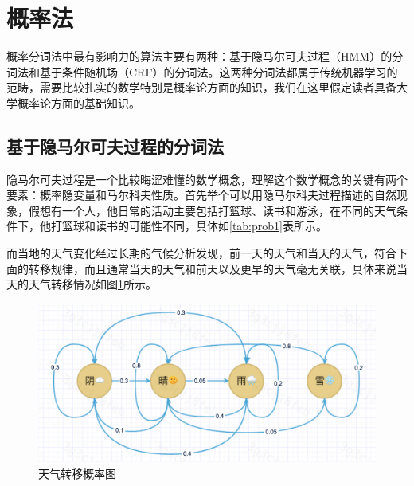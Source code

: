 \documentclass[twoside,a4paper,12pt]{book}%
\begin{document}
\section{概率法}
概率分词法中最有影响力的算法主要有两种：基于隐马尔可夫过程（\gls{HMM}）的分词法和基于条件随机场（\gls{CRF}）的分词法。这两种分词法都属于传统机器学习的范畴，需要比较扎实的数学特别是概率论方面的知识，我们在这里假定读者具备大学概率论方面的基础知识。
\subsection{基于隐马尔可夫过程的分词法}
隐马尔可夫过程是一个比较晦涩难懂的数学概念，理解这个数学概念的关键有两个要素：概率隐变量和马尔科夫性质。首先举个可以用隐马尔科夫过程描述的自然现象，假想有一个人，他日常的活动主要包括打篮球、读书和游泳，在不同的天气条件下，他打篮球和读书的可能性不同，具体如\ref{tab:prob1}表所示。
\begin{table} [h]
    \caption{天气和活动}
	\label{tab:prob1}
	\centering
\end{table}  
而当地的天气变化经过长期的气候分析发现，前一天的天气和当天的天气，符合下面的转移规律，而且通常当天的天气和前天以及更早的天气毫无关联，具体来说当天的天气转移情况如图\ref{tab:prob2}所示。
\begin{figure}[htbp]
\begin{center}
\includegraphics[width=5.5in]{figures/hmm2.png}
\caption{天气转移概率图}
\label{tab:prob2}
\end{center}
\end{figure}
\end{document}
